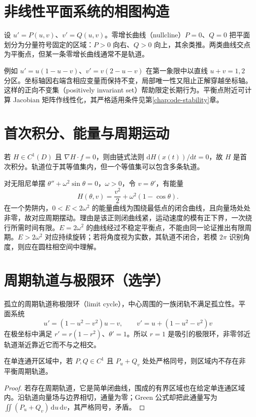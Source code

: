 \section{非线性平面系统的相图构造}
设 $u'=P(u,v)$、$v'=Q(u,v)$。零增长曲线（nullcline）$P=0$、$Q=0$ 把平面划分为分量符号固定的区域：$P>0$ 向右、$Q>0$ 向上，其余类推。两类曲线交点为平衡点，但某一条零增长曲线通常不是轨道。

例如 $u'=u(1-u-v)$、$v'=v(2-u-v)$ 在第一象限中以直线 $u+v=1,2$ 分区。坐标轴因右端含相应变量而保持不变，局部唯一性又阻止正解穿越坐标轴。这样的正向不变集（positively invariant set）帮助限定长期行为。平衡点附近可计算 Jacobian 矩阵作线性化，其严格适用条件见第\ref{chap:ode-stability}章。

\section{首次积分、能量与周期运动}
若 $H\in C^1(D)$ 且 $\nabla H\cdot f=0$，则由链式法则 $\mathrm dH(x(t))/\mathrm dt=0$，故 $H$ 是首次积分。轨道位于其等值集内，但一个等值集可以包含多条轨道。

对无阻尼单摆 $\theta''+\omega^2\sin\theta=0$，$\omega>0$，令 $v=\theta'$，有能量
\[
 H(\theta,v)=\frac{v^2}{2}+\omega^2(1-\cos\theta).
\]
在一个势阱内，$0<E<2\omega^2$ 的能量曲线为围绕最低点的闭合曲线，且向量场处处非零，故对应周期摆动。理由是该正则闭曲线紧，运动速度的模有正下界，一次绕行所需时间有限。$E=2\omega^2$ 的曲线经过不稳定平衡点，不能由同一论证推出有限周期。$E>2\omega^2$ 对应持续旋转；若将角度视为实数，其轨道不闭合，若模 $2\pi$ 识别角度，则应在圆柱相空间中理解。

\section{周期轨道与极限环（选学）}
孤立的周期轨道称极限环（limit cycle），中心周围的一族闭轨不满足孤立性。平面系统
\[
 u'=(1-u^2-v^2)u-v,\qquad v'=u+(1-u^2-v^2)v
\]
在极坐标中满足 $r'=r(1-r^2)$、$\theta'=1$。所以 $r=1$ 是吸引的极限环，非零邻近轨道渐近靠近它而不与之相交。

\begin{proposition}[Bendixson 判据]
在单连通开区域中，若 $P,Q\in C^1$ 且 $P_u+Q_v$ 处处严格同号，则区域内不存在非平衡周期轨道。
\end{proposition}
\begin{proof}
若存在周期轨道，它是简单闭曲线，围成的有界区域也在给定单连通区域内。沿轨道向量场与边界相切，通量为零；Green 公式却把此通量写为 $\iint(P_u+Q_v)\,\mathrm du\,\mathrm dv$，其严格同号，矛盾。
\end{proof}

